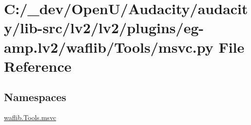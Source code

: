 \hypertarget{lv2_2plugins_2eg-amp_8lv2_2waflib_2_tools_2msvc_8py}{}\section{C\+:/\+\_\+dev/\+Open\+U/\+Audacity/audacity/lib-\/src/lv2/lv2/plugins/eg-\/amp.lv2/waflib/\+Tools/msvc.py File Reference}
\label{lv2_2plugins_2eg-amp_8lv2_2waflib_2_tools_2msvc_8py}
\subsection*{Namespaces}
\begin{DoxyCompactItemize}
\item 
 \hyperlink{namespacewaflib_1_1_tools_1_1msvc}{waflib.\+Tools.\+msvc}
\end{DoxyCompactItemize}
